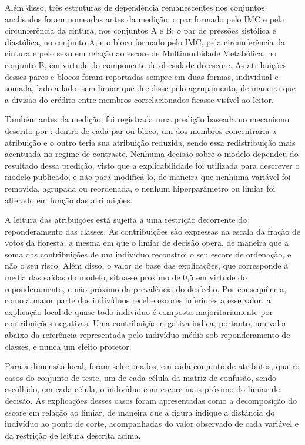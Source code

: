 Além disso, três estruturas de dependência remanescentes nos conjuntos analisados foram nomeadas antes da medição: o par formado pelo IMC e pela circunferência da cintura, nos conjuntos A e B; o par de pressões sistólica e diastólica, no conjunto A; e o bloco formado pelo IMC, pela circunferência da cintura e pelo sexo em relação ao escore de Multimorbidade Metabólica, no conjunto B, em virtude do componente de obesidade do escore. As atribuições desses pares e blocos foram reportadas sempre em duas formas, individual e somada, lado a lado, sem limiar que decidisse pelo agrupamento, de maneira que a divisão do crédito entre membros correlacionados ficasse visível ao leitor.

Também antes da medição, foi registrada uma predição baseada no mecanismo descrito por \textcite{Salih2024}: dentro de cada par ou bloco, um dos membros concentraria a atribuição e o outro teria sua atribuição reduzida, sendo essa redistribuição mais acentuada no regime de contraste. Nenhuma decisão sobre o modelo dependeu do resultado dessa predição, visto que a explicabilidade foi utilizada para descrever o modelo publicado, e não para modificá-lo, de maneira que nenhuma variável foi removida, agrupada ou reordenada, e nenhum hiperparâmetro ou limiar foi alterado em função das atribuições.

A leitura das atribuições está sujeita a uma restrição decorrente do reponderamento das classes. As contribuições são expressas na escala da fração de votos da floresta, a mesma em que o limiar de decisão opera, de maneira que a soma das contribuições de um indivíduo reconstrói o seu escore de ordenação, e não o seu risco. Além disso, o valor de base das explicações, que corresponde à média das saídas do modelo, situa-se próximo de 0,5 em virtude do reponderamento, e não próximo da prevalência do desfecho. Por consequência, como a maior parte dos indivíduos recebe escores inferiores a esse valor, a explicação local de quase todo indivíduo é composta majoritariamente por contribuições negativas. Uma contribuição negativa indica, portanto, um valor abaixo da referência representada pelo indivíduo médio sob reponderamento de classes, e nunca um efeito protetor.

Para a dimensão local, foram selecionados, em cada conjunto de atributos, quatro casos do conjunto de teste, um de cada célula da matriz de confusão, sendo escolhido, em cada célula, o indivíduo com escore mais próximo do limiar de decisão. As explicações desses casos foram apresentadas como a decomposição do escore em relação ao limiar, de maneira que a figura indique a distância do indivíduo ao ponto de corte, acompanhadas do valor observado de cada variável e da restrição de leitura descrita acima.
